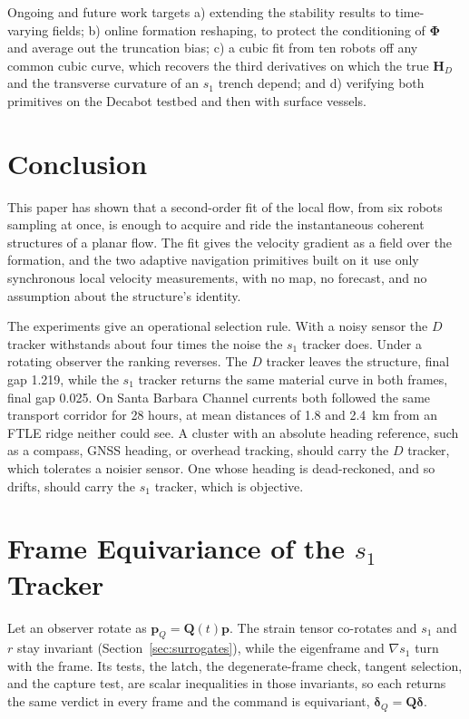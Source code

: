 \documentclass[lettersize,journal]{IEEEtran}
\begin{document}
Ongoing and future work targets a) extending the stability results to
time-varying fields; b) online formation reshaping, to protect the
conditioning of $\boldsymbol{\Phi}$ and average out the truncation
bias; c) a cubic fit from ten robots off any common cubic curve, which
recovers the third derivatives on which the true $\mathbf{H}_D$ and the
transverse curvature of an $s_1$ trench depend; and d) verifying both
primitives on the Decabot testbed and then with surface vessels.

\section{Conclusion}

This paper has shown that a second-order fit of the local flow, from six
robots sampling at once, is enough to acquire and ride the instantaneous
coherent structures of a planar flow. The fit gives the velocity gradient
as a field over the formation, and the two adaptive navigation primitives
built on it use only synchronous local velocity measurements, with no
map, no forecast, and no assumption about the structure's identity.

The experiments give an operational selection rule. With a noisy sensor
the $D$ tracker withstands about four times the noise the $s_1$ tracker does. Under a rotating observer the
ranking reverses. The $D$ tracker leaves the structure, final
gap 1.219, while the $s_1$ tracker returns the same material curve in
both frames, final gap 0.025. On Santa Barbara Channel currents both followed the same transport corridor
for 28 hours, at mean distances of 1.8 and 2.4~km from an FTLE ridge neither could see. A cluster with an absolute heading reference, such as a compass, GNSS
heading, or overhead tracking, should carry the $D$ tracker, which
tolerates a noisier sensor. One whose heading is dead-reckoned, and so
drifts, should carry the $s_1$ tracker, which is objective.

\appendices

\section{Frame Equivariance of the $s_1$ Tracker}
\label{app:equivariance}

Let an observer rotate as $\mathbf{p}_Q = \mathbf{Q}(t)\mathbf{p}$. The
strain tensor co-rotates and $s_1$ and $r$ stay invariant
(Section~\ref{sec:surrogates}), while the eigenframe and $\nabla s_1$
turn with the frame. Its tests, the latch, the degenerate-frame check, tangent
selection, and the capture test, are scalar inequalities in those
invariants, so each returns the same verdict in every frame and the
command is equivariant, $\boldsymbol{\delta}_Q = \mathbf{Q}\boldsymbol{\delta}$.
\end{document}
